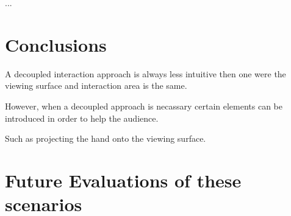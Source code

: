 \documentclass[review,journal]{vgtc}         %
\begin{document}
...

\section{Conclusions}\label{sec:conclusion}

A decoupled interaction approach is always less intuitive then one were the viewing surface and interaction area is the same.

However, when a decoupled approach is necassary certain elements can be introduced in order to help the audience.

Such as projecting the hand onto the viewing surface.

\section{Future Evaluations of these scenarios}\label{sec:future}



\end{document}
